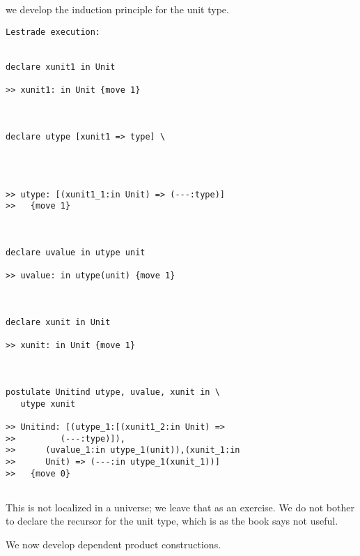 \documentclass{article}
\begin{document}
we develop the induction principle for the unit type.

\begin{verbatim}Lestrade execution:


declare xunit1 in Unit

>> xunit1: in Unit {move 1}



declare utype [xunit1 => type] \
   



>> utype: [(xunit1_1:in Unit) => (---:type)]
>>   {move 1}



declare uvalue in utype unit

>> uvalue: in utype(unit) {move 1}



declare xunit in Unit

>> xunit: in Unit {move 1}



postulate Unitind utype, uvalue, xunit in \
   utype xunit

>> Unitind: [(utype_1:[(xunit1_2:in Unit) =>
>>         (---:type)]),
>>      (uvalue_1:in utype_1(unit)),(xunit_1:in
>>      Unit) => (---:in utype_1(xunit_1))]
>>   {move 0}


\end{verbatim}

This is not localized in a universe;  we leave that as an exercise.  We do not bother to declare the recursor for the unit type, which is as the book
says not useful.

We now develop dependent product constructions.
\end{document}
